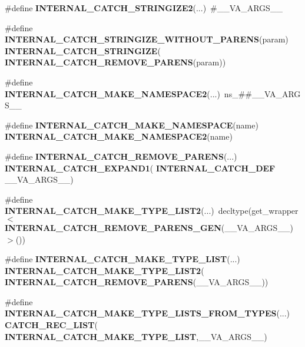 \begin{DoxyCompactItemize}
\item 
\#define \textbf{ I\+N\+T\+E\+R\+N\+A\+L\+\_\+\+C\+A\+T\+C\+H\+\_\+\+S\+T\+R\+I\+N\+G\+I\+Z\+E2}(...)~\#\+\_\+\+\_\+\+V\+A\+\_\+\+A\+R\+G\+S\+\_\+\+\_\+
\item 
\#define \textbf{ I\+N\+T\+E\+R\+N\+A\+L\+\_\+\+C\+A\+T\+C\+H\+\_\+\+S\+T\+R\+I\+N\+G\+I\+Z\+E\+\_\+\+W\+I\+T\+H\+O\+U\+T\+\_\+\+P\+A\+R\+E\+NS}(param)~\textbf{ I\+N\+T\+E\+R\+N\+A\+L\+\_\+\+C\+A\+T\+C\+H\+\_\+\+S\+T\+R\+I\+N\+G\+I\+ZE}(\textbf{ I\+N\+T\+E\+R\+N\+A\+L\+\_\+\+C\+A\+T\+C\+H\+\_\+\+R\+E\+M\+O\+V\+E\+\_\+\+P\+A\+R\+E\+NS}(param))
\item 
\#define \textbf{ I\+N\+T\+E\+R\+N\+A\+L\+\_\+\+C\+A\+T\+C\+H\+\_\+\+M\+A\+K\+E\+\_\+\+N\+A\+M\+E\+S\+P\+A\+C\+E2}(...)~ns\+\_\+\#\#\+\_\+\+\_\+\+V\+A\+\_\+\+A\+R\+G\+S\+\_\+\+\_\+
\item 
\#define \textbf{ I\+N\+T\+E\+R\+N\+A\+L\+\_\+\+C\+A\+T\+C\+H\+\_\+\+M\+A\+K\+E\+\_\+\+N\+A\+M\+E\+S\+P\+A\+CE}(name)~\textbf{ I\+N\+T\+E\+R\+N\+A\+L\+\_\+\+C\+A\+T\+C\+H\+\_\+\+M\+A\+K\+E\+\_\+\+N\+A\+M\+E\+S\+P\+A\+C\+E2}(name)
\item 
\#define \textbf{ I\+N\+T\+E\+R\+N\+A\+L\+\_\+\+C\+A\+T\+C\+H\+\_\+\+R\+E\+M\+O\+V\+E\+\_\+\+P\+A\+R\+E\+NS}(...)~\textbf{ I\+N\+T\+E\+R\+N\+A\+L\+\_\+\+C\+A\+T\+C\+H\+\_\+\+E\+X\+P\+A\+N\+D1}(\textbf{ I\+N\+T\+E\+R\+N\+A\+L\+\_\+\+C\+A\+T\+C\+H\+\_\+\+D\+EF} \+\_\+\+\_\+\+V\+A\+\_\+\+A\+R\+G\+S\+\_\+\+\_\+)
\item 
\#define \textbf{ I\+N\+T\+E\+R\+N\+A\+L\+\_\+\+C\+A\+T\+C\+H\+\_\+\+M\+A\+K\+E\+\_\+\+T\+Y\+P\+E\+\_\+\+L\+I\+S\+T2}(...)~decltype(get\+\_\+wrapper$<$\textbf{ I\+N\+T\+E\+R\+N\+A\+L\+\_\+\+C\+A\+T\+C\+H\+\_\+\+R\+E\+M\+O\+V\+E\+\_\+\+P\+A\+R\+E\+N\+S\+\_\+\+G\+EN}(\+\_\+\+\_\+\+V\+A\+\_\+\+A\+R\+G\+S\+\_\+\+\_\+)$>$())
\item 
\#define \textbf{ I\+N\+T\+E\+R\+N\+A\+L\+\_\+\+C\+A\+T\+C\+H\+\_\+\+M\+A\+K\+E\+\_\+\+T\+Y\+P\+E\+\_\+\+L\+I\+ST}(...)~\textbf{ I\+N\+T\+E\+R\+N\+A\+L\+\_\+\+C\+A\+T\+C\+H\+\_\+\+M\+A\+K\+E\+\_\+\+T\+Y\+P\+E\+\_\+\+L\+I\+S\+T2}(\textbf{ I\+N\+T\+E\+R\+N\+A\+L\+\_\+\+C\+A\+T\+C\+H\+\_\+\+R\+E\+M\+O\+V\+E\+\_\+\+P\+A\+R\+E\+NS}(\+\_\+\+\_\+\+V\+A\+\_\+\+A\+R\+G\+S\+\_\+\+\_\+))
\item 
\#define \textbf{ I\+N\+T\+E\+R\+N\+A\+L\+\_\+\+C\+A\+T\+C\+H\+\_\+\+M\+A\+K\+E\+\_\+\+T\+Y\+P\+E\+\_\+\+L\+I\+S\+T\+S\+\_\+\+F\+R\+O\+M\+\_\+\+T\+Y\+P\+ES}(...)~\textbf{ C\+A\+T\+C\+H\+\_\+\+R\+E\+C\+\_\+\+L\+I\+ST}(\textbf{ I\+N\+T\+E\+R\+N\+A\+L\+\_\+\+C\+A\+T\+C\+H\+\_\+\+M\+A\+K\+E\+\_\+\+T\+Y\+P\+E\+\_\+\+L\+I\+ST},\+\_\+\+\_\+\+V\+A\+\_\+\+A\+R\+G\+S\+\_\+\+\_\+)

\end{DoxyCompactItemize}
